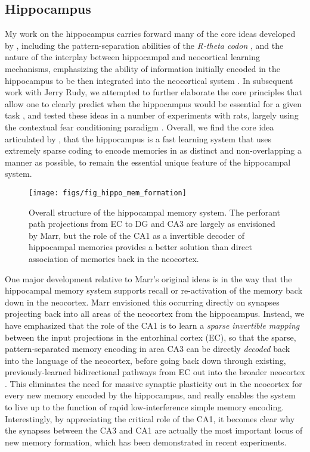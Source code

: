 \documentclass[11pt,twoside]{article}
\newif\myifpdf
\begin{document}
\subsection{Hippocampus}

My work on the hippocampus carries forward many of the core ideas developed by , including the pattern-separation abilities of the {\em R-theta codon} \cite{OReillyMcClelland94}, and the nature of the interplay between hippocampal and neocortical learning mechanisms, emphasizing the ability of information initially encoded in the hippocampus to be then integrated into the neocortical system \cite{McClellandMcNaughtonOReilly95}.  In subsequent work with Jerry Rudy, we attempted to further elaborate the core principles that allow one to clearly predict when the hippocampus would be essential for a given task \cite{OReillyRudy01}, and tested these ideas in a number of experiments with rats, largely using the contextual fear conditioning paradigm \cite[e.g.,]{RudyOReilly01,RudyOReilly99}.  Overall, we find the core idea articulated by , that the hippocampus is a fast learning system that uses extremely sparse coding to encode memories in as distinct and non-overlapping a manner as possible, to remain the essential unique feature of the hippocampal system.

\begin{figure}
  \centering\texttt{[image: figs/fig\_hippo\_mem\_formation]}
  \caption{\small Overall structure of the hippocampal memory system.  The perforant path projections from EC to DG and CA3 are largely as envisioned by Marr, but the role of the CA1 as a invertible decoder of hippocampal memories provides a better solution than direct association of memories back in the neocortex.}
  \label{fig.hip}
\end{figure}

One major development relative to Marr's original ideas is in the way that the hippocampal memory system supports recall or re-activation of the memory back down in the neocortex.  Marr envisioned this occurring directly on synapses projecting back into all areas of the neocortex from the hippocampus.  Instead, we have emphasized that the role of the CA1 is to learn a {\em sparse invertible mapping} between the input projections in the entorhinal cortex (EC), so that the sparse, pattern-separated memory encoding in area CA3 can be directly {\em decoded} back into the language of the neocortex, before going back down through existing, previously-learned bidirectional pathways from EC out into the broader neocortex \cite{KetzMorkondaOReilly13}.  This eliminates the need for massive synaptic plasticity out in the neocortex for every new memory encoded by the hippocampus, and really enables the system to live up to the function of rapid low-interference simple memory encoding.  Interestingly, by appreciating the critical role of the CA1, it becomes clear why the synapses between the CA3 and CA1 are actually the most important locus of new memory formation, which has been demonstrated in recent experiments.
\end{document}
